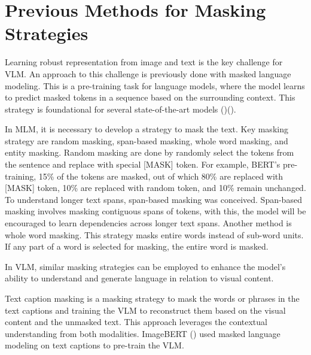 
\section{Previous Methods for Masking Strategies}
Learning robust representation from image and text is the key challenge for VLM. An approach to this challenge is previously done with masked language modeling. This is a pre-training task for language models, where the model learns to predict masked tokens in a sequence based on the surrounding context. This strategy is foundational for several state-of-the-art models (\cite{devlin2018bert})(\cite{liu2020roberta}). 

In MLM, it is necessary to develop a strategy to mask the text. Key masking strategy are random masking, span-based masking, whole word masking, and entity masking. Random masking are done by randomly select the tokens from the sentence and replace with special [MASK] token. For example, BERT's pre-training, 15\% of the tokens are masked, out of which 80\% are replaced with [MASK] token, 10\% are replaced with random token, and 10\% remain unchanged. 
To understand longer text spans, span-based masking was conceived. Span-based masking involves masking contiguous spans of tokens, with this, the model will be encouraged to learn dependencies across longer text spans. 
Another method is whole word masking. This strategy masks entire words instead of sub-word units. If any part of a word is selected for masking, the entire word is masked.

In VLM, similar masking strategies can be employed to enhance the model's ability to understand and generate language in relation to visual content.

Text caption masking is a masking strategy to mask the words or phrases in the text captions and training the VLM to reconstruct them based on the visual content and the unmasked text. This approach leverages the contextual understanding from both modalities. ImageBERT (\cite{qi2020imagebertcrossmodalpretraininglargescale}) used masked language modeling on text captions to pre-train the VLM.

